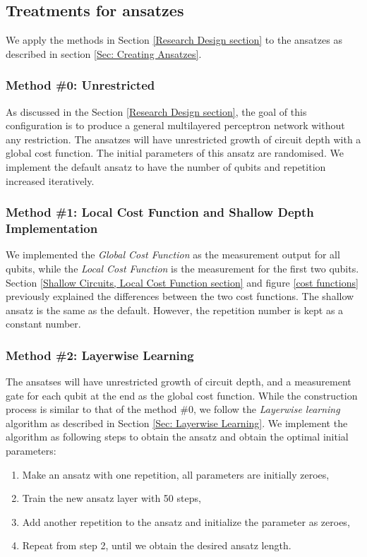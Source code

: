 \subsection{Treatments for ansatzes} \label{Sec: Treatments for ansatzes}

We apply the methods in Section \ref{Research Design section} to the ansatzes as described in section \ref{Sec: Creating Ansatzes}.

\subsubsection{Method \#0: Unrestricted} \label{Sec: Method0}
As discussed in the Section \ref{Research Design section}, the goal of this configuration is to produce a general multilayered perceptron network without any restriction.
The ansatzes will have unrestricted growth of circuit depth with a global cost function.
The initial parameters of this ansatz are randomised.
We implement the default ansatz to have the number of qubits and repetition increased iteratively.

\subsubsection{Method \#1: Local Cost Function and Shallow Depth Implementation} \label{Sec: Method1}
We implemented the \textit{Global Cost Function} as the measurement output for all qubits, while the \textit{Local Cost Function} is the measurement for the first two qubits.
Section \ref{Shallow Circuits, Local Cost Function section} and figure \ref{cost functions} previously explained the differences between the two cost functions.
The shallow ansatz is the same as the default.
However, the repetition number is kept as a constant number.

\subsubsection{Method \#2: Layerwise Learning} \label{Sec: Method2}
The ansatses will have unrestricted growth of circuit depth, and a measurement gate for each qubit at the end as the global cost function.
While the construction process is similar to that of the method \#0, we follow the \emph{Layerwise learning} algorithm as described in Section \ref{Sec: Layerwise Learning}.
We implement the algorithm as following steps to obtain the ansatz and obtain the optimal initial parameters:
\begin{enumerate}
    \item Make an ansatz with one repetition, all parameters are initially zeroes,
    \item Train the new ansatz layer with 50 steps,
    \item Add another repetition to the ansatz and initialize the parameter as zeroes,
    \item Repeat from step 2, until we obtain the desired ansatz length.
\end{enumerate}

